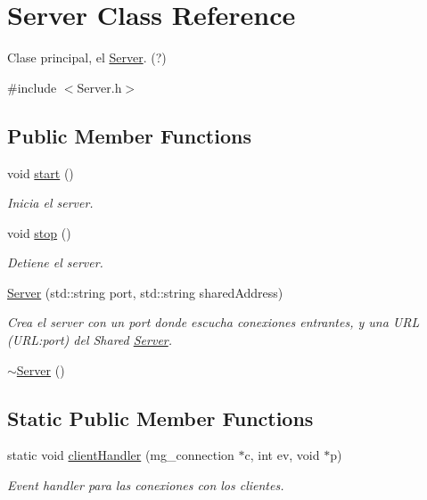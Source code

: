 \hypertarget{class_server}{}\section{Server Class Reference}
\label{class_server}


Clase principal, el \hyperlink{class_server}{Server}. (?)  




{\ttfamily \#include $<$Server.\+h$>$}

\subsection*{Public Member Functions}
\begin{DoxyCompactItemize}
\item 
void \hyperlink{class_server_a7eac07d2582fa01c2671362efa955b31}{start} ()
\begin{DoxyCompactList}\small\item\em Inicia el server. \end{DoxyCompactList}\item 
void \hyperlink{class_server_a07c45a7e101a3926d8f9685c3c5d14e4}{stop} ()
\begin{DoxyCompactList}\small\item\em Detiene el server. \end{DoxyCompactList}\item 
\hyperlink{class_server_ab304cb02833b94847e8655bbf929224d}{Server} (std\+::string port, std\+::string shared\+Address)
\begin{DoxyCompactList}\small\item\em Crea el server con un port donde escucha conexiones entrantes, y una U\+R\+L (U\+R\+L\+:port) del Shared \hyperlink{class_server}{Server}. \end{DoxyCompactList}\item 
\hyperlink{class_server_a4b3aa2579cb1c8cd1d069582c14d0fa6}{$\sim$\+Server} ()
\end{DoxyCompactItemize}
\subsection*{Static Public Member Functions}
\begin{DoxyCompactItemize}
\item 
static void \hyperlink{class_server_ac3f610990e6c5d339cf38cbf495f598e}{client\+Handler} (mg\+\_\+connection $\ast$c, int ev, void $\ast$p)
\begin{DoxyCompactList}\small\item\em Event handler para las conexiones con los clientes. \end{DoxyCompactList}\end{DoxyCompactItemize}


